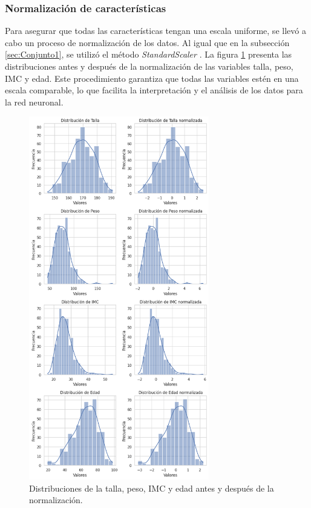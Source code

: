 \subsubsection{Normalización de características}

Para asegurar que todas las características tengan una escala uniforme, se llevó a cabo un proceso de normalización 
de los datos. Al igual que en la subsección \ref{sec:Conjunto1}, se utilizó el método \emph{StandardScaler} \citep{CITE:50}. La 
figura \ref{fig:normalizacion2} presenta las distribuciones antes y después de la normalización de las variables talla, peso, IMC y edad. Este procedimiento garantiza que todas las variables estén en una escala comparable, 
lo que facilita la interpretación y el análisis de los datos para la red neuronal.

\begin{figure}[H]
	\centering
	\includegraphics[width=0.7\textwidth]{./Figures/normalizacion2.png}
	\caption{Distribuciones de la talla, peso, IMC y edad antes y después de la normalización.}\label{fig:normalizacion2}
\end{figure}

